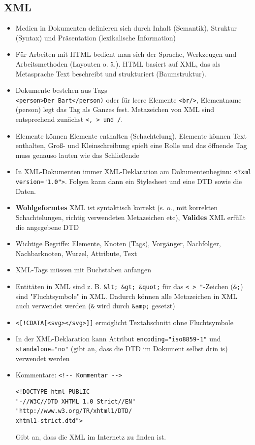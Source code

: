 \documentclass[12pt,landscape]{article}
\begin{document}
\begin{multicols}{3}
\section{XML}
\begin{itemize}
\item Medien in Dokumenten definieren sich durch Inhalt (Semantik), Struktur (Syntax) und Präsentation (lexikalische Information)
\item Für Arbeiten mit HTML bedient man sich der Sprache, Werkzeugen und Arbeitsmethoden (Layouten o. ä.). HTML basiert auf XML, das als Metasprache Text beschreibt und strukturiert (Baumstruktur). 
\item Dokumente bestehen aus Tags\\
\lstinline|<person>Der Bart</person)| oder für leere Elemente \lstinline|<br/>|, Elementname (person) legt das Tag als Ganzes fest. Metazeichen von XML sind entsprechend zunächst \lstinline|<, > und /|.
\item Elemente können Elemente enthalten (Schachtelung), Elemente können Text enthalten, Groß- und Kleinschreibung spielt eine Rolle und das öffnende Tag muss genauso lauten wie das Schließende
\item In XML-Dokumenten immer XML-Deklaration am Dokumentenbeginn: \lstinline|<?xml version="1.0">|. Folgen kann dann ein Stylesheet und eine DTD sowie die Daten.
\item \textbf{Wohlgeformtes} XML ist syntaktisch korrekt (s. o., mit korrekten Schachtelungen, richtig verwendeten Metazeichen etc), \textbf{Valides} XML erfüllt die angegebene DTD
\item Wichtige Begriffe: Elemente, Knoten (Tags), Vorgänger, Nachfolger, Nachbarknoten, Wurzel, Attribute, Text
\item XML-Tags müssen mit Buchstaben anfangen
\item Entitäten in XML sind z. B. \lstinline|&lt; &gt; &quot;| für das \lstinline|< > "|-Zeichen (\lstinline|&;|) sind "Fluchtsymbole" in XML. Dadurch können alle Metazeichen in XML auch verwendet werden (\lstinline|&| wird durch \lstinline|&amp;| gesetzt)
\item \lstinline|<[!CDATA[<svg></svg>]]| ermöglicht Textabschnitt ohne Fluchtsymbole
\item In der XML-Deklaration kann Attribut \lstinline|encoding="iso8859-1"| und \lstinline|standalone="no"| (gibt an, dass die DTD im Dokument selbst drin is) verwendet werden
\item Kommentare: \lstinline|<!-- Kommentar -->|
\begin{lstlisting}
<!DOCTYPE html PUBLIC
"-//W3C//DTD XHTML 1.0 Strict//EN"
"http://www.w3.org/TR/xhtml1/DTD/
xhtml1-strict.dtd">
\end{lstlisting}
Gibt an, dass die XML im Internetz zu finden ist.
\end{itemize}

\end{multicols}
\end{document}
